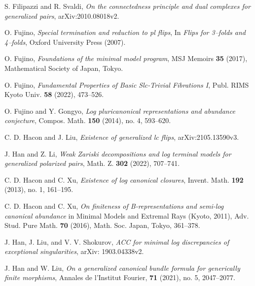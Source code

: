 \documentclass[11pt]{amsart}
\numberwithin{equation}{section}
\theoremstyle{definition}
\theoremstyle{definition}
\theoremstyle{definition}
\begin{document}
\begin{thebibliography}{ABCDE}
       S. Filipazzi and R. Svaldi, \textit{On the
        connectedness principle and dual complexes for generalized
      pairs}, arXiv:2010.08018v2.

       O. Fujino, \textit{Special termination
      and reduction to pl flips}, In \textit{Flips for 3--folds and
      4--folds}, Oxford University Press (2007).


       O. Fujino, \textit{Foundations of the
      minimal model program}, MSJ Memoirs \textbf{35} (2017),
      Mathematical Society of Japan, Tokyo.

       O. Fujino, \textit{Fundamental
      Properties of Basic Slc-Trivial Fibrations I}, Publ. RIMS Kyoto
      Univ. \textbf{58} (2022), 473--526.

       O. Fujino and Y. Gongyo, \textit{Log
      pluricanonical representations and abundance conjecture},
      Compos. Math. \textbf{150} (2014), no. 4, 593--620.

       C. D. Hacon and J. Liu,
      \textit{Existence of generalized lc flips}, arXiv:2105.13590v3.

       J. Han and Z. Li, \textit{Weak Zariski
        decompositions and log terminal models for generalized
      polarized pairs}, Math. Z. \textbf{302} (2022), 707--741.

       C. D. Hacon and C. Xu, \textit{Existence
      of log canonical closures}, Invent. Math. \textbf{192} (2013),
      no. 1, 161--195.

       C. D. Hacon and C. Xu, \textit{On
        finiteness of B-representations and semi-log canonical
      abundance} in Minimal Models and Extremal Rays (Kyoto, 2011),
      Adv. Stud. Pure Math. \textbf{70} (2016), Math. Soc. Japan,
      Tokyo, 361--378.

       J. Han, J. Liu, and V. V. Shokurov,
      \textit{ACC for minimal log discrepancies of exceptional
      singularities}, arXiv: 1903.04338v2.

       J. Han and W. Liu, \textit{On a
        generalized canonical bundle formula for generically finite
      morphisms}, Annales de l'Institut Fourier, \textbf{71} (2021),
      no. 5, 2047--2077.


\end{thebibliography}
\end{document}
